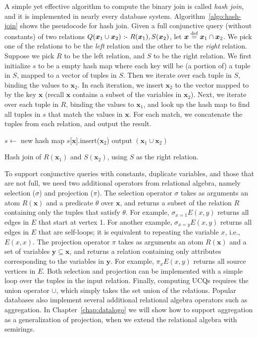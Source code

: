 A simple yet effective algorithm to compute the binary join is called {\em hash join},
 and it is implemented in nearly every database system.
Algorithm~\ref{algo:hash-join} shows the pseudocode for hash join.
Given a full conjunctive query (without constants) 
 of two relations $Q({\bm x_1} \cup {\bm x_2}) \text{ :- } R({\bm x_1}), S({\bm x_2})$,
 let ${\bm x} \stackrel{\text{def}}{=} {\bm x_1} \cap {\bm x_2}$.
We pick one of the relations to be the {\em left} relation and the other to be the {\em right} relation.
Suppose we pick $R$ to be the left relation, and $S$ to be the right relation.
We first initialize $s$ to be a empty hash map
 where each key will be (a portion of) a tuple in $S$,
 mapped to a vector of tuples in $S$.
Then we iterate over each tuple in $S$, 
 binding the values to ${\bm x_2}$.
In each iteration,
 we insert ${\bm x_2}$ to the vector mapped to by the key ${\bm x}$ (recall ${\bm x}$ contains a subset of the variables in ${\bm x_2}$).
Next, we iterate over each tuple in $R$,
 binding the values to ${\bm x_1}$,
 and look up the hash map to find all tuples in $s$ that match the values in ${\bm x}$.
For each match, we concatenate the tuples from each relation,
 and output the result.
%
\begin{algorithm}[th]
    $s \gets$ new hash map\;
    {
        $s$[${\bm x}$].insert(${\bm x_2}$)\;
    }
    {
        {
            output $({\bm x_1}\cup {\bm x_2})$\;
        }
    }
    \caption{Hash join of $R({\bm x_1})$ and $S({\bm x_2})$, using $S$ as the right relation.}
    \label{algo:hash-join}
\end{algorithm}

To support conjunctive queries with constants, 
 duplicate variables, and those that are not full,
 we need two additional operators from relational algebra, 
 namely selection ($\sigma$) and projection ($\pi$).
The selection operator $\sigma$ takes as arguments an atom $R({\bm x})$
 and a predicate $\theta$ over ${\bm x}$,
 and returns a subset of the relation $R$ containing only the tuples that satisfy $\theta$.
For example, $\sigma_{x = 1}E(x, y)$ returns all edges in $E$ that start at vertex 1.
For another example, $\sigma_{x = y}E(x, y)$ returns all edges in $E$ that are self-loops;
 it is equivalent to repeating the variable $x$, i.e., $E(x, x)$.
The projection operator $\pi$ takes as arguments an atom $R({\bm x})$
 and a set of variables ${\bm y} \subseteq {\bm x}$,
 and returns a relation containing only attributes corresponding 
 to the variables in ${\bm y}$.
For example, $\pi_{x}E(x, y)$ returns all source vertices in $E$.
Both selection and projection can be implemented with a simple loop over the tuples in the input relation.
Finally, computing UCQs requires the union operator $\cup$,
 which simply takes the set union of the relations.
Popular databases also implement several additional relational algebra operators 
 such as aggregation.
In Chapter~\ref{chap:datalogo} we will show how to support aggregation
 as a generalization of projection, 
 when we extend the relational algebra with semirings.

